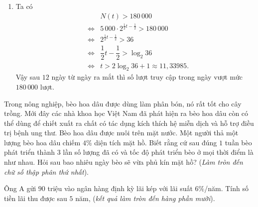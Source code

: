 \begin{ex}
{\begin{enumerate}
			\item Ta có 
			\allowdisplaybreaks
			\begin{eqnarray*}
				&& N(t) > 180\,000 \\
				&\Leftrightarrow& 5\,000\cdot 2^{\tfrac{1}{2}t-\tfrac{1}{2}} > 180\, 000 \\
				&\Leftrightarrow& 2^{\tfrac{1}{2}t-\tfrac{1}{2}} > 36 \\
				&\Leftrightarrow& \dfrac{1}{2}t - \dfrac{1}{2} > \log_2 36 \\
				&\Leftrightarrow& t > 2\log_2 36 + 1\approx 11{,}33985.
			\end{eqnarray*}
			Vậy sau $12$ ngày từ ngày ra mắt thì số lượt truy cập trong ngày vượt mức $180\,000$ lượt.
		\end{enumerate}
	}
\end{ex}

\begin{ex} %
	 		Trong nông nghiệp, bèo hoa dâu được dùng làm phân bón, nó rất tốt cho cây trồng. Mới đây các nhà khoa học Việt Nam đã phát hiện ra bèo hoa dâu còn có thể dùng để chiết xuất ra chất có tác dụng kích thích hệ miễn dịch và hỗ trợ điều trị bệnh ung thư. Bèo hoa dâu được nuôi trên mặt nước. Một người thả một lượng bèo hoa dâu chiếm $4\%$ diện tích mặt hồ. Biết rằng cứ sau đúng $1$ tuần bèo phát triển thành $3$ lần số lượng đã có và tốc độ phát triển bèo ở mọi thời điểm là như nhau. Hỏi sau bao nhiêu ngày bèo sẽ vừa phủ kín mặt hồ? (\textit{Làm tròn đến chữ số thập phân thứ nhất}).
	 	\end{ex}

\begin{ex}%
	 			Ông A gửi $90$ triệu vào ngân hàng định kỳ lãi kép với lãi suất $6\%$/năm. Tính số tiền lãi thu được sau $5$ năm, (\textit{kết quả làm tròn đến hàng phần mười}).
	 	\end{ex}

